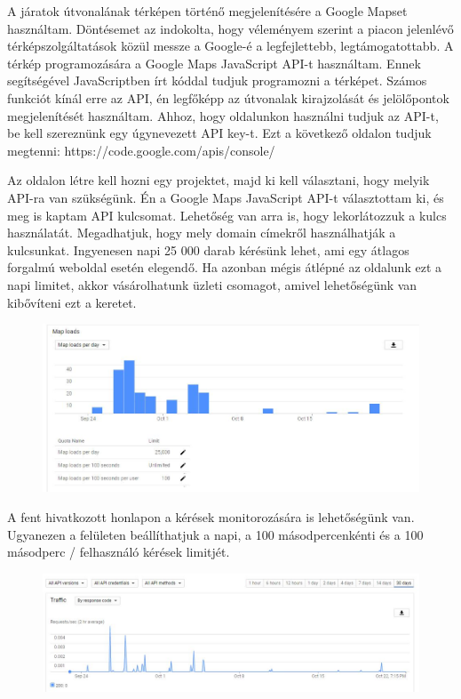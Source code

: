 
A járatok útvonalának térképen történő megjelenítésére a Google Mapset használtam. Döntésemet az indokolta, hogy véleményem szerint a piacon jelenlévő térképszolgáltatások közül messze a Google-é a legfejlettebb, legtámogatottabb. A térkép programozására a Google Maps JavaScript API-t használtam. Ennek segítségével JavaScriptben írt kóddal tudjuk programozni a térképet. Számos funkciót kínál erre az API, én legfőképp az útvonalak kirajzolását és jelölőpontok megjelenítését használtam. Ahhoz, hogy oldalunkon használni tudjuk az API-t, be kell szereznünk egy úgynevezett API key-t. Ezt a következő oldalon tudjuk megtenni: https://code.google.com/apis/console/

Az oldalon létre kell hozni egy projektet, majd ki kell választani, hogy melyik API-ra van szükségünk. Én a Google Maps JavaScript API-t választottam ki, és meg is kaptam API kulcsomat. Lehetőség van arra is, hogy lekorlátozzuk a kulcs használatát. Megadhatjuk, hogy mely domain címekről használhatják a kulcsunkat. Ingyenesen napi 25 000 darab kérésünk lehet, ami egy átlagos forgalmú weboldal esetén elegendő. Ha azonban mégis átlépné az oldalunk ezt a napi limitet, akkor vásárolhatunk üzleti csomagot, amivel lehetőségünk van kibővíteni ezt a keretet.

\begin{figure}[h!]
\centering
\includegraphics[scale=0.5]{kepek/google_maps_api_1.jpg}
\caption{}
\label{fig:google_maps_api_1}
\end{figure}

A fent hivatkozott honlapon a kérések monitorozására is lehetőségünk van. Ugyanezen a felületen beállíthatjuk a napi, a 100 másodpercenkénti és a 100 másodperc / felhasználó kérések limitjét.

\begin{figure}[h!]
\centering
\includegraphics[scale=0.5]{kepek/google_maps_api_2.jpg}
\caption{}
\label{fig:google_maps_api_2}
\end{figure}

